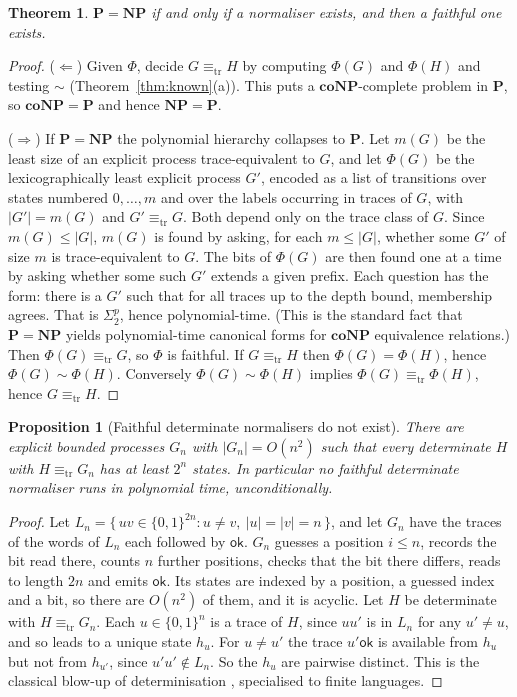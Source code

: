 \documentclass[11pt]{article}
\theoremstyle{definition}
\theoremstyle{plain}
\newtheorem{proposition}[definition]{Proposition}
\newtheorem{theorem}[definition]{Theorem}
\theoremstyle{remark}
\newcommand{\sbisim}{\sim}
\newcommand{\treq}{\equiv_{\mathrm{tr}}}
\newcommand{\ok}{\mathsf{ok}}
\newcommand{\Pclass}{\mathbf{P}}
\newcommand{\NPclass}{\mathbf{NP}}
\newcommand{\coNP}{\mathbf{coNP}}
\begin{document}
\begin{theorem}\label{thm:normaliser}
$\Pclass = \NPclass$ if and only if a normaliser exists, and then a
faithful one exists.
\end{theorem}

\begin{proof}
($\Leftarrow$) Given $\Phi$, decide $G \treq H$ by computing $\Phi(G)$ and
$\Phi(H)$ and testing $\sbisim$ (Theorem~\ref{thm:known}(a)). This puts a
$\coNP$-complete problem in $\Pclass$, so $\coNP = \Pclass$ and hence
$\NPclass = \Pclass$.

($\Rightarrow$) If $\Pclass = \NPclass$ the polynomial hierarchy collapses
to $\Pclass$. Let $m(G)$ be the least size of an explicit process
trace-equivalent to $G$, and let $\Phi(G)$ be the lexicographically least
explicit process $G'$, encoded as a list of transitions over states
numbered $0, \dots, m$ and over the labels occurring in traces of $G$, with $|G'| = m(G)$ and
$G' \treq G$. Both depend only on the trace class of $G$. Since $m(G) \le
|G|$, $m(G)$ is found by asking, for each $m \le |G|$, whether some $G'$
of size $m$ is trace-equivalent to $G$. The bits of $\Phi(G)$ are then
found one at a time by asking whether some such $G'$ extends a given
prefix. Each question has the form: there is a $G'$ such that for all
traces up to the depth bound, membership agrees. That is
$\Sigma^p_2$, hence polynomial-time. (This is the standard fact that
$\Pclass = \NPclass$ yields polynomial-time canonical forms for
$\coNP$ equivalence relations.) Then $\Phi(G) \treq G$, so
$\Phi$ is faithful. If $G \treq H$ then $\Phi(G) = \Phi(H)$, hence
$\Phi(G) \sbisim \Phi(H)$. Conversely $\Phi(G) \sbisim \Phi(H)$ implies
$\Phi(G) \treq \Phi(H)$, hence $G \treq H$.
\end{proof}

\begin{proposition}[Faithful determinate normalisers do not exist]\label{prop:determinate}
There are explicit bounded processes $G_n$ with $|G_n| = O(n^2)$ such
that every determinate $H$ with $H \treq G_n$ has at least $2^n$ states.
In particular no faithful determinate normaliser runs in polynomial time,
unconditionally.
\end{proposition}

\begin{proof}
Let $L_n = \{\, uv \in \{0,1\}^{2n} : u \neq v,\ |u| = |v| = n \,\}$, and
let $G_n$ have the traces of the words of $L_n$ each followed by $\ok$.
$G_n$ guesses a position $i \le n$, records the bit read there, counts
$n$ further positions, checks that the bit there differs, reads to length
$2n$ and emits $\ok$. Its states are indexed by a position, a guessed
index and a bit, so there are $O(n^2)$ of them, and it is acyclic. Let $H$
be determinate with $H \treq G_n$. Each $u \in \{0,1\}^n$ is a trace of
$H$, since $u u'$ is in $L_n$ for any $u' \ne u$, and so leads to a
unique state $h_u$. For $u \neq u'$ the trace $u' \ok$ is available from
$h_u$ but not from $h_{u'}$, since $u'u' \notin L_n$. So the $h_u$ are
pairwise distinct. This is the classical blow-up of determinisation
\cite{MeyerFischer71,Moore71}, specialised to finite languages.
\end{proof}
\end{document}
